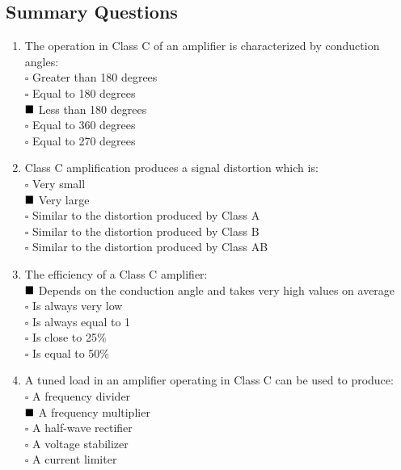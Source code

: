 \documentclass[12pt,a4paper]{article}
\begin{document}
    \subsection{Summary Questions}
    \begin{enumerate}
        \item The operation in Class C of an amplifier is characterized by conduction angles: \\
        \(\square\) Greater than 180 degrees \\
        \(\square\) Equal to 180 degrees \\
        \(\textcolor{black}{\blacksquare}\) Less than 180 degrees \\
        \(\square\) Equal to 360 degrees \\
        \(\square\) Equal to 270 degrees

        \item Class C amplification produces a signal distortion which is: \\
        \(\square\) Very small \\
        \(\textcolor{black}{\blacksquare}\) Very large \\
        \(\square\) Similar to the distortion produced by Class A \\
        \(\square\) Similar to the distortion produced by Class B \\
        \(\square\) Similar to the distortion produced by Class AB

        \item The efficiency of a Class C amplifier: \\
        \(\textcolor{black}{\blacksquare}\) Depends on the conduction angle and takes very high values on average \\
        \(\square\) Is always very low \\
        \(\square\) Is always equal to 1 \\
        \(\square\) Is close to 25\% \\
        \(\square\) Is equal to 50\%

        \item A tuned load in an amplifier operating in Class C can be used to produce: \\
        \(\square\) A frequency divider \\
        \(\textcolor{black}{\blacksquare}\) A frequency multiplier \\
        \(\square\) A half-wave rectifier \\
        \(\square\) A voltage stabilizer \\
        \(\square\) A current limiter
    \end{enumerate}
\end{document}
